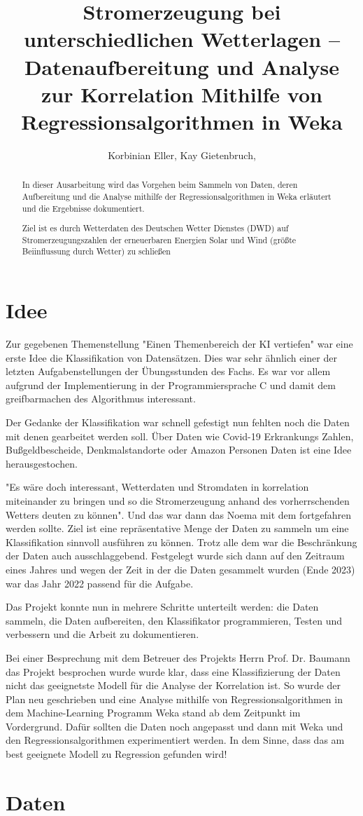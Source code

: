 \documentclass[letterpaper]{article} %
\title{Stromerzeugung bei unterschiedlichen Wetterlagen -- Datenaufbereitung und Analyse zur Korrelation Mithilfe von Regressionsalgorithmen in Weka}
\author {
    Korbinian Eller,
    Kay Gietenbruch,
}
\begin{document}
\maketitle
\begin{abstract}
    In dieser Ausarbeitung wird das Vorgehen beim Sammeln von Daten, deren Aufbereitung und die Analyse mithilfe der Regressionsalgorithmen in Weka erläutert und die Ergebnisse dokumentiert.
    
    Ziel ist es durch Wetterdaten des Deutschen Wetter Dienstes (DWD) auf Stromerzeugungszahlen der erneuerbaren Energien Solar und Wind (größte Beiinflussung durch Wetter) zu schließen  
\end{abstract}
\section*{Idee}
    Zur gegebenen Themenstellung "Einen Themenbereich der KI vertiefen" war eine erste Idee die Klassifikation von Datensätzen.
    Dies war sehr ähnlich einer der letzten Aufgabenstellungen der Übungsstunden des Fachs.
    Es war vor allem aufgrund der Implementierung in der Programmiersprache C und damit dem greifbarmachen des Algorithmus interessant.

    Der Gedanke der Klassifikation war schnell gefestigt nun fehlten noch die Daten mit denen gearbeitet werden soll. Über Daten wie Covid-19 Erkrankungs Zahlen, Bußgeldbescheide, Denkmalstandorte oder Amazon Personen Daten ist eine Idee herausgestochen.

    "Es wäre doch interessant, Wetterdaten und Stromdaten in korrelation miteinander zu bringen und so die Stromerzeugung anhand des vorherrschenden Wetters deuten zu können". Und das war dann das Noema mit dem fortgefahren werden sollte. Ziel ist eine repräsentative Menge der Daten zu sammeln um eine Klassifikation sinnvoll ausführen zu können. Trotz alle dem war die Beschränkung der Daten auch ausschlaggebend. Festgelegt wurde sich dann auf den Zeitraum eines Jahres und wegen der Zeit in der die Daten gesammelt wurden (Ende 2023) war das Jahr 2022 passend für die Aufgabe.
    
    Das Projekt konnte nun in mehrere Schritte unterteilt werden: die Daten sammeln, die Daten aufbereiten, den Klassifikator programmieren, Testen und verbessern und die Arbeit zu dokumentieren.

    Bei einer Besprechung mit dem Betreuer des Projekts Herrn Prof. Dr. Baumann das Projekt besprochen wurde wurde klar, dass eine Klassifizierung der Daten nicht das geeignetste Modell für die Analyse der 
    Korrelation ist. So wurde der Plan neu geschrieben und eine Analyse mithilfe von Regressionsalgorithmen in dem Machine-Learning Programm Weka stand ab dem Zeitpunkt im Vordergrund.
    Dafür sollten die Daten noch angepasst und dann mit Weka und den Regressionsalgorithmen experimentiert werden. In dem Sinne, dass das am best geeignete Modell zu Regression gefunden wird!
\section*{Daten}
\end{document}

